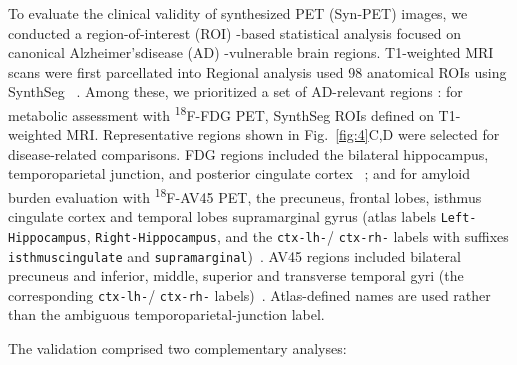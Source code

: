 \documentclass{article}
\providecommand{\DIFaddtex}[1]{{\protect\color{blue} \sf #1}} %
\providecommand{\DIFdeltex}[1]{{\protect\color{red} \scriptsize #1}} %
\providecommand{\DIFaddbegin}{} %
\providecommand{\DIFaddend}{} %
\providecommand{\DIFdelbegin}{} %
\providecommand{\DIFdelend}{} %
\providecommand{\DIFadd}[1]{\texorpdfstring{\DIFaddtex{#1}}{#1}} %
\providecommand{\DIFdel}[1]{\texorpdfstring{\DIFdeltex{#1}}{}} %
\newcommand{\DIFscaledelfig}{0.5}
\newlength{\DIFdelgraphicswidth} %
\newlength{\DIFdelgraphicsheight} %
\newcommand{\DIFaddincludegraphics}[2][]{{\color{blue}\fbox{\DIFOincludegraphics[#1]{#2}}}} %
\newcommand{\DIFdelincludegraphics}[2][]{%
\sbox{\DIFdelgraphicsbox}{\DIFOincludegraphics[#1]{#2}}%
\settoboxwidth{\DIFdelgraphicswidth}{\DIFdelgraphicsbox} %
\settoboxtotalheight{\DIFdelgraphicsheight}{\DIFdelgraphicsbox} %
\scalebox{\DIFscaledelfig}{%
\parbox[b]{\DIFdelgraphicswidth}{\usebox{\DIFdelgraphicsbox}\\[-\baselineskip] \rule{\DIFdelgraphicswidth}{0em}}\llap{\resizebox{\DIFdelgraphicswidth}{\DIFdelgraphicsheight}{%
\setlength{\unitlength}{\DIFdelgraphicswidth}%
\begin{picture}(1,1)%
\thicklines\linethickness{2pt} %
{\color[rgb]{1,0,0}\put(0,0){\framebox(1,1){}}}%
{\color[rgb]{1,0,0}\put(0,0){\line( 1,1){1}}}%
{\color[rgb]{1,0,0}\put(0,1){\line(1,-1){1}}}%
\end{picture}%
}\hspace*{3pt}}} %
} %
\DeclareRobustCommand{\DIFaddbegin}{\DIFOaddbegin \let\includegraphics\DIFaddincludegraphics} %
\DeclareRobustCommand{\DIFaddend}{\DIFOaddend \let\includegraphics\DIFOincludegraphics} %
\DeclareRobustCommand{\DIFdelbegin}{\DIFOdelbegin \let\includegraphics\DIFdelincludegraphics} %
\DeclareRobustCommand{\DIFdelend}{\DIFOaddend \let\includegraphics\DIFOincludegraphics} %
\begin{document}
\DIFdelbegin \DIFdel{To evaluate the clinical validity of synthesized PET (Syn-PET) images, we conducted a region-of-interest (ROI) -based statistical analysis focused on canonical Alzheimer’sdisease (AD) -vulnerable brain regions. T1-weighted MRI scans were first parcellated into }\DIFdelend \DIFaddbegin \DIFadd{Regional analysis used }\DIFaddend 98 \DIFdelbegin \DIFdel{anatomical ROIs using SynthSeg ~\cite{synthseg}. Among these, we prioritized a set of AD-relevant regions : for metabolic assessment with \textsuperscript{18}F-FDG PET,}\DIFdelend \DIFaddbegin \DIFadd{SynthSeg ROIs defined on T1-weighted MRI. Representative regions shown in Fig.~\ref{fig:4}C,D were selected for disease-related comparisons. FDG regions included }\DIFaddend the bilateral hippocampus, \DIFdelbegin \DIFdel{temporoparietal junction, and posterior cingulate cortex ~\cite{mueller2005alzheimers}; and for amyloid burden evaluation with \textsuperscript{18}F-AV45 PET, the precuneus, frontal lobes, }\DIFdelend \DIFaddbegin \DIFadd{isthmus cingulate cortex }\DIFaddend and \DIFdelbegin \DIFdel{temporal lobes}\DIFdelend \DIFaddbegin \DIFadd{supramarginal gyrus (atlas labels \texttt{Left-Hippocampus}, \texttt{Right-Hippocampus}, and the \texttt{ctx-lh-}/}\allowbreak\DIFadd{\texttt{ctx-rh-} labels with suffixes \texttt{isthmuscingulate} and \texttt{supramarginal})~\cite{mosconi2005reduced,he2015meta,strom2022cortical}. AV45 regions included bilateral precuneus and inferior, middle, superior and transverse temporal gyri (the corresponding \texttt{ctx-lh-}/}\allowbreak\DIFadd{\texttt{ctx-rh-} labels)}\DIFaddend ~\cite{wong2010in}. \DIFaddbegin \DIFadd{Atlas-defined names are used rather than the ambiguous temporoparietal-junction label.
}\DIFaddend 

The validation comprised two complementary analyses:
\end{document}
